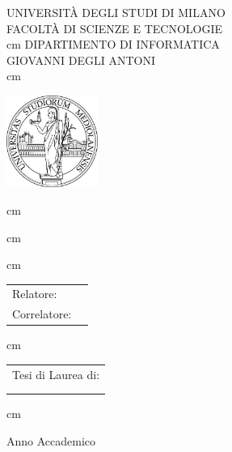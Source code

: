 \begin{titlingpage}

\begin{center}
	{\LARGE \uppercase{Università degli Studi di Milano}}\\
	\uppercase{Facoltà di Scienze e Tecnologie}\\
	 cm
	\uppercase{Dipartimento di Informatica\\Giovanni Degli Antoni}\\
	 cm
	\centerline{\includegraphics[height=30mm]{immagini/unimi}}
	 cm
	\Large\uppercase{\myCDL}

	\vfill
	 cm

	{\Large\uppercase\expandafter{\myTitle}}
\end{center}

\vfill
{} cm
		
\begin{tabular}{ll}
	{\large Relatore:} & \myRefereeA\\
	{\large Correlatore:} & \myRefereeB\\
\end{tabular}	

\vfill
{} cm

\begin{flushright}
	\begin{tabular}{l}
		{\large Tesi di Laurea di:}\\
		{\large \myName}\\
		{\large \myMat}\\
	\end{tabular}	
\end{flushright}
	
\vfill
{} cm

\begin{center}
	Anno Accademico \myYY
\end{center}

\end{titlingpage}
